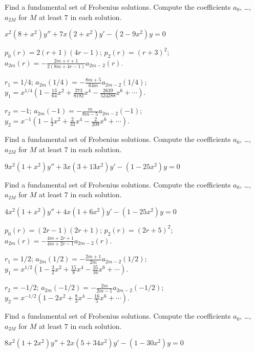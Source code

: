 \documentclass{ximera}
\begin{document}
\begin{problem}\label{exer:7.5.48}
Find a
fundamental set of Frobenius solutions. Compute  the
coefficients $a_0$, \dots, $a_{2M}$ for $M$ at least $7$ in each
solution.

$x^2(8+x^2)y''+7x(2+x^2)y'-(2-9x^2)y=0$

\begin{solution}
    $p_0(r)=2(r+1)(4r-1)$;
$p_2(r)=(r+3)^2$;
$a_{2m}(r)=-\frac{2m+r+1}{2(8m+4r-1)} a_{2m-2}(r)$.

$r_1=1/4$;
$a_{2m}(1/4)=-\frac{8m+5}{64m} a_{2m-2}(1/4)$;
$y_1=x^{1/4}\left(1-\frac{13}{64}x^2+\frac{273}{8192}x^4-
\frac{2639}{524288}x^6 +\cdots\right)$.


$r_2=-1$;
$a_{2m}(-1)=-\frac{m}{8m-5} a_{2m-2}(-1)$;
$y_2=x^{-1}\left(1-\frac{1}{3}x^2+\frac{2}{33}x^4-\frac{2}{209}x^6
+\cdots\right)$.
\end{solution}
\end{problem}

\begin{problem}\label{exer:7.5.49}
Find a
fundamental set of Frobenius solutions. Compute  the
coefficients $a_0$, \dots, $a_{2M}$ for $M$ at least $7$ in each
solution.

$9x^2(1+x^2)y''+3x(3+13x^2)y'-(1-25x^2)y=0$
\end{problem}

\begin{problem}\label{exer:7.5.50} 
Find a
fundamental set of Frobenius solutions. Compute  the
coefficients $a_0$, \dots, $a_{2M}$ for $M$ at least $7$ in each
solution.

$4x^2(1+x^2)y''+4x(1+6x^2)y'-(1-25x^2)y=0$

\begin{solution}
    $p_0(r)=(2r-1)(2r+1)$;
$p_2(r)=(2r+5)^2$;
$a_{2m}(r)=-\frac{4m+2r+1}{4m+2r-1} a_{2m-2}(r)$.

$r_1=1/2$;
$a_{2m}(1/2)=-\frac{2m+1}{2m} a_{2m-2}(1/2)$;
$y_1=x^{1/2}\left(1-\frac{3}{2}x^2+\frac{15}{8}x^4-\frac{35}{16}x^6
+\cdots\right)$.


$r_2=-1/2$;
$a_{2m}(-1/2)=-\frac{2m}{2m-1} a_{2m-2}(-1/2)$;
$y_2=x^{-1/2}\left(1-2x^2+\frac{8}{3}x^4-\frac{16}{5}x^6
+\cdots\right)$.
\end{solution}
\end{problem}

\begin{problem}\label{exer:7.5.51}
Find a
fundamental set of Frobenius solutions. Compute  the
coefficients $a_0$, \dots, $a_{2M}$ for $M$ at least $7$ in each
solution.

$8x^2(1+2x^2)y''+2x(5+34x^2)y'-(1-30x^2)y=0$
\end{problem}
\end{document}
